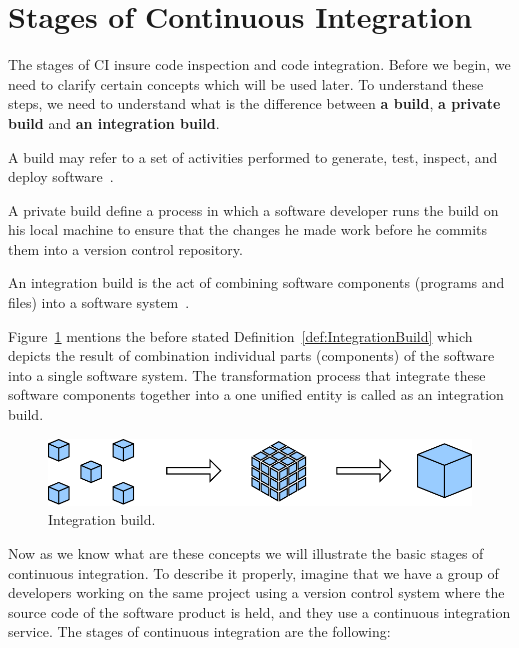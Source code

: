 \section{Stages of Continuous Integration}

The stages of CI insure code inspection and code integration. Before we begin, we need to clarify certain concepts which will be used later. To understand these steps, we need to understand what is the difference between \textbf{a build}, \textbf{a private build} and \textbf{an integration build}.

\begin{DEF}
A build may refer to a set of activities performed to generate, test, inspect, and deploy software~\cite{CIbook}.
\end{DEF}

\begin{DEF}
A private build define a process in which a software developer runs the build on his local machine to ensure that the changes he made work before he commits them into a version control repository.
\end{DEF}

\begin{DEF}\label{def:IntegrationBuild}
An integration build is the act of combining software components (programs and files) into a software system~\cite{CIbook}.
\end{DEF}

Figure~\ref{fig:IntegrationBuild} mentions the before stated Definition~\ref{def:IntegrationBuild} which depicts the result of combination individual parts (components) of the software into a single software system. The transformation process that integrate these software components together into a one unified entity is called as an integration build.

\begin{figure}[H]
    \centering
    \includegraphics[scale=1]{img/system_integration.pdf}
    \caption{Integration build.}
    \label{fig:IntegrationBuild}
\end{figure}


Now as we know what are these concepts we will illustrate the basic stages of continuous integration. To describe it properly, imagine that we have a group of developers working on the same project using a version control system where the source code of the software product is held, and they use a continuous integration service. The stages of continuous integration are the following:

